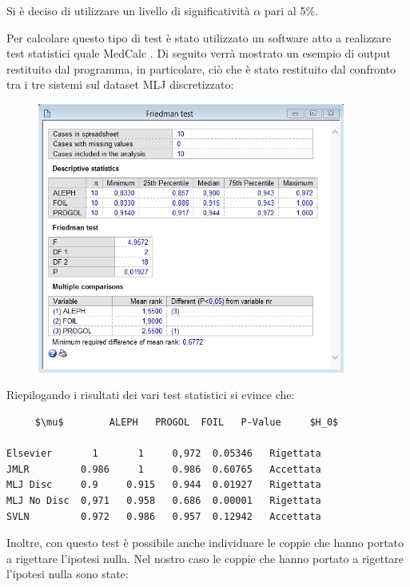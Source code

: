 Si è deciso di utilizzare un livello di significatività $\alpha$ pari al 5\%.

Per calcolare questo tipo di test è stato utilizzato un software atto a realizzare test statistici quale MedCalc \textcopyright.
Di seguito verrà mostrato un esempio di output restituito dal programma, in particolare, ciò che è stato restituito dal confronto tra i tre sistemi sul dataset MLJ discretizzato:
\begin{figure}[H]
	\includegraphics[width=0.9\textwidth]{img/TestResult/mljdiscr.png}
	\label{Friedman Test - MLJ Discretizzato}
\end{figure}

Riepilogando i risultati dei vari test statistici si evince che:

\begin{lstlisting}
     $\mu$        ALEPH   PROGOL  FOIL   P-Value     $H_0$
     
Elsevier       1       1     0,972  0.05346   Rigettata
JMLR         0.986     1     0.986  0.60765   Accettata
MLJ Disc     0.9     0.915   0.944  0.01927   Rigettata
MLJ No Disc  0,971   0.958   0.686  0.00001   Rigettata
SVLN         0.972   0.986   0.957  0.12942   Accettata
\end{lstlisting}


Inoltre, con questo test è possibile anche individuare le coppie che hanno portato a rigettare l'ipotesi nulla. Nel nostro caso le coppie che hanno portato a rigettare l'ipotesi nulla sono state:

